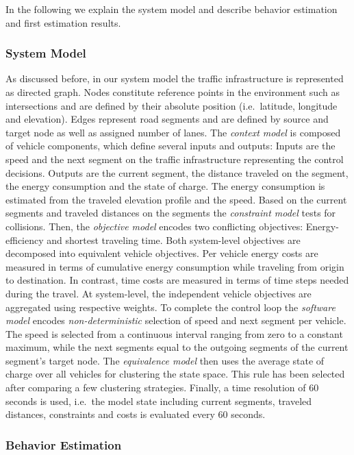 \documentclass[conference]{../cls/IEEEtran}
\begin{document}
In the following we explain the system model and describe behavior estimation and first estimation results.

\subsubsection*{System Model}

As discussed before, in our system model the traffic infrastructure is represented as directed graph. Nodes constitute reference points in the environment such as intersections and are defined by their absolute position (i.e.\ latitude, longitude and elevation). Edges represent road segments and are defined by source and target node as well as assigned number of lanes. The \textit{context model} is composed of vehicle components, which define several inputs and outputs: Inputs are the speed and the next segment on the traffic infrastructure representing the control decisions. Outputs are the current segment, the distance traveled on the segment, the energy consumption and the state of charge. The energy consumption is estimated from the traveled elevation profile and the speed. Based on the current segments and traveled distances on the segments the \textit{constraint model} tests for collisions. Then, the \textit{objective model} encodes two conflicting objectives: Energy-efficiency and shortest traveling time. Both system-level objectives are decomposed into equivalent vehicle objectives. Per vehicle energy costs are measured in terms of cumulative energy consumption while traveling from origin to destination. In contrast, time costs are measured in terms of time steps needed during the travel. At system-level, the independent vehicle objectives are aggregated using respective weights. To complete the control loop the \textit{software model} encodes \textit{non-deterministic} selection of speed and next segment per vehicle. The speed is selected from a continuous interval ranging from zero to a constant maximum, while the next segments equal to the outgoing segments of the current segment's target node. The \textit{equivalence model} then uses the average state of charge over all vehicles for clustering the state space. This rule has been selected after comparing a few clustering strategies. Finally, a time resolution of 60 seconds is used, i.e.\ the model state including current segments, traveled distances, constraints and costs is evaluated every 60 seconds.

\subsubsection*{Behavior Estimation}
\end{document}
